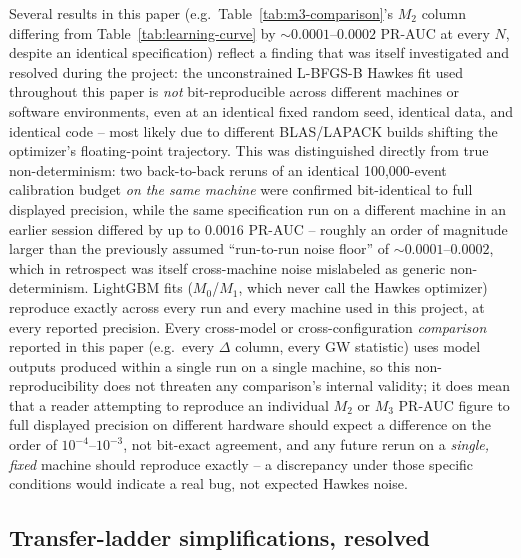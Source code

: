 Several results in this paper (e.g.\ Table~\ref{tab:m3-comparison}'s
$M_2$ column differing from Table~\ref{tab:learning-curve} by
$\sim 0.0001$--$0.0002$ PR-AUC at every $N$, despite an identical
specification) reflect a finding that was itself investigated and
resolved during the project: the unconstrained L-BFGS-B Hawkes fit used
throughout this paper is \emph{not} bit-reproducible across different
machines or software environments, even at an identical fixed random
seed, identical data, and identical code -- most likely due to different
BLAS/LAPACK builds shifting the optimizer's floating-point trajectory.
This was distinguished directly from true non-determinism: two
back-to-back reruns of an identical 100{,}000-event calibration budget
\emph{on the same machine} were confirmed bit-identical to full displayed
precision, while the same specification run on a different machine in an
earlier session differed by up to $0.0016$ PR-AUC -- roughly an order of
magnitude larger than the previously assumed ``run-to-run noise floor''
of $\sim0.0001$--$0.0002$, which in retrospect was itself cross-machine
noise mislabeled as generic non-determinism. LightGBM fits ($M_0$/$M_1$,
which never call the Hawkes optimizer) reproduce exactly across every
run and every machine used in this project, at every reported precision.
Every cross-model or cross-configuration \emph{comparison} reported in
this paper (e.g.\ every $\Delta$ column, every GW statistic) uses model
outputs produced within a single run on a single machine, so this
non-reproducibility does not threaten any comparison's internal validity;
it does mean that a reader attempting to reproduce an individual $M_2$ or
$M_3$ PR-AUC figure to full displayed precision on different hardware
should expect a difference on the order of $10^{-4}$--$10^{-3}$, not
bit-exact agreement, and any future rerun on a \emph{single, fixed}
machine should reproduce exactly -- a discrepancy under those specific
conditions would indicate a real bug, not expected Hawkes noise.

\subsection{Transfer-ladder simplifications, resolved}
\label{sec:limitations-transfer}

